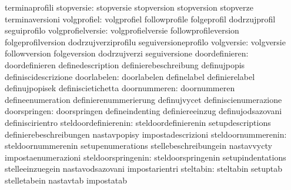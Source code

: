                                   terminaprofili
                      stopversie: stopversie                       stopversion
                                  stopversion                      stopverze
                                  terminaversioni
                     volgprofiel: volgprofiel                      followprofile
                                  folgeprofil                      dodrzujprofil
                                  seguiprofilo
               volgprofielversie: volgprofielversie                followprofileversion
                                  folgeprofilversion               dodrzujverziprofilu
                                  seguiversioneprofilo
                      volgversie: volgversie                       followversion
                                  folgeversion                     dodrzujverzi
                                  seguiversione
                  doordefinieren: doordefinieren                   definedescription
                                  definierebeschreibung            definujpopis
                                  definiscidescrizione
                     doorlabelen: doorlabelen                      definelabel
                                  definierelabel                   definujpopisek
                                  definiscietichetta
                    doornummeren: doornummeren                     defineenumeration
                                  definierenummerierung            definujvycet
                                  definiscienumerazione
                    doorspringen: doorspringen                     defineindenting
                                  definiereeinzug                  definujodsazovani
                                  definiscirientro
            steldoordefinierenin: steldoordefinierenin             setupdescriptions
                                  definierebeschreibungen          nastavpopisy
                                  impostadescrizioni
              steldoornummerenin: steldoornummerenin               setupenumerations
                                  stellebeschreibungein            nastavvycty
                                  impostaenumerazioni
              steldoorspringenin: steldoorspringenin               setupindentations
                                  stelleeinzuegein                 nastavodsazovani
                                  impostarientri
                       steltabin: steltabin                        setuptab
                                  stelletabein                     nastavtab
                                  impostatab
